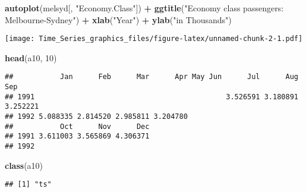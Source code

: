 \documentclass[]{article}
\newenvironment{Shaded}{\begin{snugshade}}{\end{snugshade}}
\newcommand{\DecValTok}[1]{\textcolor[rgb]{0.00,0.00,0.81}{#1}}
\newcommand{\KeywordTok}[1]{\textcolor[rgb]{0.13,0.29,0.53}{\textbf{#1}}}
\newcommand{\NormalTok}[1]{#1}
\newcommand{\OperatorTok}[1]{\textcolor[rgb]{0.81,0.36,0.00}{\textbf{#1}}}
\newcommand{\StringTok}[1]{\textcolor[rgb]{0.31,0.60,0.02}{#1}}
\begin{document}
\begin{Shaded}
\begin{Highlighting}[]
\KeywordTok{autoplot}\NormalTok{(melsyd[, }\StringTok{"Economy.Class"}\NormalTok{]) }\OperatorTok{+}\StringTok{ }\KeywordTok{ggtitle}\NormalTok{(}\StringTok{"Economy class passengers: Melbourne-Sydney"}\NormalTok{) }\OperatorTok{+}
\StringTok{  }\KeywordTok{xlab}\NormalTok{(}\StringTok{"Year"}\NormalTok{) }\OperatorTok{+}\StringTok{ }\KeywordTok{ylab}\NormalTok{(}\StringTok{"in Thousands"}\NormalTok{)}
\end{Highlighting}
\end{Shaded}

\texttt{[image: Time\_Series\_graphics\_files/figure-latex/unnamed-chunk-2-1.pdf]}

\begin{Shaded}
\begin{Highlighting}[]
\KeywordTok{head}\NormalTok{(a10, }\DecValTok{10}\NormalTok{)}
\end{Highlighting}
\end{Shaded}

\begin{verbatim}
##           Jan      Feb      Mar      Apr May Jun      Jul      Aug      Sep
## 1991                                             3.526591 3.180891 3.252221
## 1992 5.088335 2.814520 2.985811 3.204780                                   
##           Oct      Nov      Dec
## 1991 3.611003 3.565869 4.306371
## 1992
\end{verbatim}

\begin{Shaded}
\begin{Highlighting}[]
\KeywordTok{class}\NormalTok{(a10)}
\end{Highlighting}
\end{Shaded}

\begin{verbatim}
## [1] "ts"
\end{verbatim}

\begin{Shaded}
\end{Shaded}
\end{document}
